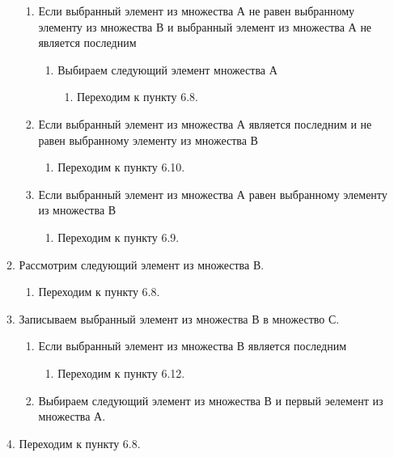 \documentclass[a4paper,12pt]{extarticle}
\begin{document}
\begin{enumerate}
\begin{enumerate}[label*=\arabic*.]
    \begin{enumerate}[label*=\arabic*.]
      \item Если выбранный элемент из множества А не равен выбранному элементу из множества В и выбранный элемент из множества А не является последним
      \begin{enumerate}[label*=\arabic*.]
        \item Выбираем следующий элемент множества А
        \begin{enumerate}[label*=\arabic*.]
          \item Переходим к пункту 6.8.
        \end{enumerate}
      \end{enumerate}
      \item Если выбранный элемент из множества А является последним и не равен выбранному элементу из множества В
      \begin{enumerate}[label*=\arabic*.]
        \item Переходим к пункту 6.10.
      \end{enumerate}
      \item Если выбранный элемент из множества А равен выбранному элементу из множества В
      \begin{enumerate}[label*=\arabic*.]
        \item Переходим к пункту 6.9.
      \end{enumerate}
    \end{enumerate}
    \item Рассмотрим следующий элемент из множества В.
    \begin{enumerate}[label*=\arabic*.]
      \item Переходим к пункту 6.8.
    \end{enumerate}
    \item Записываем выбранный элемент из множества В в множество С.
    \begin{enumerate}[label*=\arabic*.]
      \item Если выбранный элемент из множества В является последним
      \begin{enumerate}[label*=\arabic*.]
        \item Переходим к пункту 6.12.
      \end{enumerate}
      \item Выбираем следующий элемент из множества В и первый эелемент из множества А.
    \end{enumerate}
    \item Переходим к пункту 6.8.

\end{enumerate}
\end{enumerate}
\end{document}
